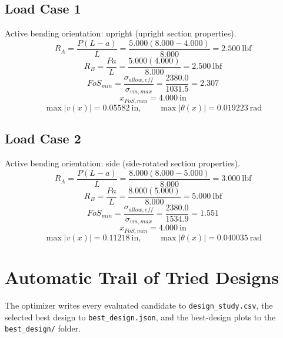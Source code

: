 \documentclass[11pt]{article}
\begin{document}
\subsection*{Load Case 1}
Active bending orientation: upright (upright section properties).
\[R_A = \frac{P(L-a)}{L} = \frac{5.000(8.000-4.000)}{8.000} = 2.500\ \mathrm{lbf}\]
\[R_B = \frac{Pa}{L} = \frac{5.000(4.000)}{8.000} = 2.500\ \mathrm{lbf}\]
\[FoS_{min} = \frac{\sigma_{allow,eff}}{\sigma_{vm,max}} = \frac{2380.0}{1031.5} = 2.307\]
\[x_{FoS,min} = 4.000\ \mathrm{in}\]
\[\max |v(x)| = 0.05582\ \mathrm{in}, \qquad \max |\theta(x)| = 0.019223\ \mathrm{rad}\]
\subsection*{Load Case 2}
Active bending orientation: side (side-rotated section properties).
\[R_A = \frac{P(L-a)}{L} = \frac{8.000(8.000-5.000)}{8.000} = 3.000\ \mathrm{lbf}\]
\[R_B = \frac{Pa}{L} = \frac{8.000(5.000)}{8.000} = 5.000\ \mathrm{lbf}\]
\[FoS_{min} = \frac{\sigma_{allow,eff}}{\sigma_{vm,max}} = \frac{2380.0}{1534.9} = 1.551\]
\[x_{FoS,min} = 4.000\ \mathrm{in}\]
\[\max |v(x)| = 0.11218\ \mathrm{in}, \qquad \max |\theta(x)| = 0.040035\ \mathrm{rad}\]

\section*{Automatic Trail of Tried Designs}
The optimizer writes every evaluated candidate to \texttt{design\_study.csv}, the selected best design to \texttt{best\_design.json}, and the best-design plots to the \texttt{best\_design/} folder.
\end{document}
